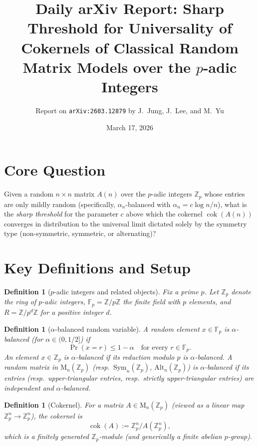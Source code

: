 \documentclass[11pt,a4paper]{article}
\title{Daily arXiv Report: Sharp Threshold for Universality of Cokernels of Classical Random Matrix Models over the $p$-adic Integers}
\author{Report on \texttt{arXiv:2603.12879} by J.~Jung, J.~Lee, and M.~Yu}
\date{March 17, 2026}
\newtheorem{definition}[theorem]{Definition}
\begin{document}
\maketitle

\section{Core Question}

Given a random $n\times n$ matrix $A(n)$ over the $p$-adic integers $\mathbb{Z}_p$ whose entries are only mildly random (specifically, $\alpha_n$-balanced with $\alpha_n = c\log n / n$), what is the \emph{sharp threshold} for the parameter $c$ above which the cokernel $\operatorname{cok}(A(n))$ converges in distribution to the universal limit dictated solely by the symmetry type (non-symmetric, symmetric, or alternating)?

\section{Key Definitions and Setup}

\begin{definition}[$p$-adic integers and related objects]
Fix a prime $p$. Let $\mathbb{Z}_p$ denote the ring of $p$-adic integers, $\mathbb{F}_p = \mathbb{Z}/p\mathbb{Z}$ the finite field with $p$ elements, and $R = \mathbb{Z}/p^d\mathbb{Z}$ for a positive integer $d$.
\end{definition}

\begin{definition}[$\alpha$-balanced random variable]
A random element $x \in \mathbb{F}_p$ is \emph{$\alpha$-balanced} (for $\alpha \in (0,1/2]$) if
\[
\Pr(x = r) \le 1 - \alpha \quad \text{for every } r \in \mathbb{F}_p.
\]
An element $x \in \mathbb{Z}_p$ is $\alpha$-balanced if its reduction modulo $p$ is $\alpha$-balanced. A random matrix in $\mathrm{M}_n(\mathbb{Z}_p)$ (resp.\ $\mathrm{Sym}_n(\mathbb{Z}_p)$, $\mathrm{Alt}_n(\mathbb{Z}_p)$) is $\alpha$-balanced if its entries (resp.\ upper-triangular entries, resp.\ strictly upper-triangular entries) are independent and $\alpha$-balanced.
\end{definition}

\begin{definition}[Cokernel]
For a matrix $A \in \mathrm{M}_n(\mathbb{Z}_p)$ (viewed as a linear map $\mathbb{Z}_p^n \to \mathbb{Z}_p^n$), the \emph{cokernel} is
\[
\operatorname{cok}(A) := \mathbb{Z}_p^n / A(\mathbb{Z}_p^n),
\]
which is a finitely generated $\mathbb{Z}_p$-module (and generically a finite abelian $p$-group).
\end{definition}
\end{document}

